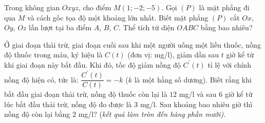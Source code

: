 \begin{ex}%
	Trong không gian $Oxyz$, cho điểm $M(1;-2;-5)$. Gọi $(P)$ là mặt phẳng đi qua $M$ và cách gốc tọa độ một khoảng lớn nhất. Biết mặt phẳng $(P)$ cắt $Ox$, $Oy$, $Oz$ lần lượt tại ba điểm $A$, $B$, $C$. Thể tích tứ diện $OABC$ bằng bao nhiêu?
\end{ex}

\begin{ex}%
	Ở giai đoạn thải trừ, giai đoạn cuối sau khi một người uống một liều thuốc, nồng độ thuốc trong máu, ký hiệu là $C(t)$ (đơn vị: mg/l), giảm dần sau $t$ giờ kể từ khi giai đoạn này bắt đầu. Khi đó, tốc độ giảm nồng độ $C^\prime(t)$ tỉ lệ với chính nồng độ hiện có, tức là: $\dfrac{C^\prime(t)}{C(t)}=-k$ ($k$ là một hằng số dương). Biết rằng khi bắt đầu giai đoạn thải trừ, nồng độ thuốc còn lại là $12$ mg/l và sau $6$ giờ kể từ lúc bắt đầu thải trừ, nồng độ đo được là $3$ mg/l. Sau khoảng bao nhiêu giờ thì nồng độ còn lại bằng $2$ mg/l? (\textit{kết quả làm tròn đến hàng phần mười)}.
\end{ex}

